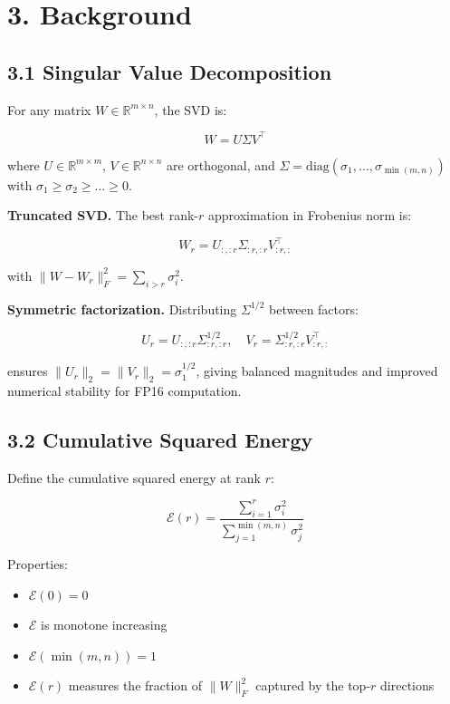 
\section{3. Background}

\subsection{3.1 Singular Value Decomposition}

For any matrix $W \in \mathbb{R}^{m \times n}$, the SVD is:

\[
W = U \Sigma V^\top
\tag{3.1}
\]

where $U \in \mathbb{R}^{m \times m}$, $V \in \mathbb{R}^{n \times n}$ are 
orthogonal, and $\Sigma = \mathrm{diag}(\sigma_1, \dots, \sigma_{\min(m,n)})$ 
with $\sigma_1 \geq \sigma_2 \geq \dots \geq 0$.

\textbf{Truncated SVD.} The best rank-$r$ approximation in Frobenius norm is:

\[
W_r = U_{:, :r} \Sigma_{:r, :r} V_{:r, :}^\top
\tag{3.2}
\]

with $\|W - W_r\|_F^2 = \sum_{i > r} \sigma_i^2$.

\textbf{Symmetric factorization.} Distributing $\Sigma^{1/2}$ between factors:

\[
U_r = U_{:, :r} \Sigma_{:r, :r}^{1/2}, \quad
V_r = \Sigma_{:r, :r}^{1/2} V_{:r, :}^\top
\tag{3.3}
\]

ensures $\|U_r\|_2 = \|V_r\|_2 = \sigma_1^{1/2}$, giving balanced magnitudes 
and improved numerical stability for FP16 computation.

\subsection{3.2 Cumulative Squared Energy}

Define the cumulative squared energy at rank $r$:

\[
\mathcal{E}(r) = \frac{\sum_{i=1}^{r} \sigma_i^2}{\sum_{j=1}^{\min(m,n)} \sigma_j^2}
\tag{3.4}
\]

Properties:
\begin{itemize}
\item $\mathcal{E}(0) = 0$
\item $\mathcal{E}$ is monotone increasing
\item $\mathcal{E}(\min(m, n)) = 1$
\item $\mathcal{E}(r)$ measures the fraction of $\|W\|_F^2$ captured by the top-$r$ directions
\end{itemize}

